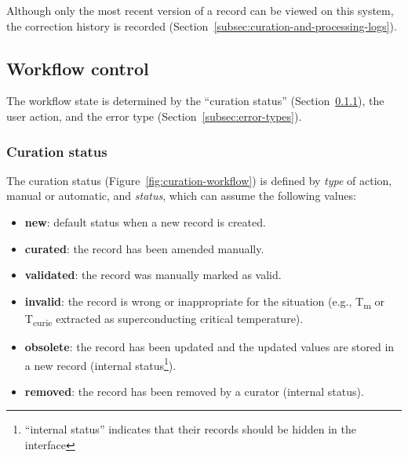 \documentclass[]{interact}
\theoremstyle{plain} %
\theoremstyle{definition}
\theoremstyle{remark}
\begin{document}
Although only the most recent version of a record can be viewed on this system, the correction history is recorded (Section~\ref{subsec:curation-and-processing-logs}). 



\subsection{Workflow control}
\label{subsec:workflow-control}
The workflow state is determined by the ``curation status'' (Section~\ref{subsec:curation-status}), the user action, and the error type (Section~\ref{subsec:error-types}).

\subsubsection{Curation status} 
\label{subsec:curation-status}
The curation status (Figure~\ref{fig:curation-workflow}) is defined by \emph{type} of action, manual or automatic, and \emph{status}, which can assume the following values: 
\begin{itemize}
    \item \textbf{new}: default status when a new record is created.
    \item \textbf{curated}: the record has been amended manually.
    \item \textbf{validated}: the record was manually marked as valid.
    \item \textbf{invalid}: the record is wrong or inappropriate for the situation (e.g., T\textsubscript{m} or T\textsubscript{curie} extracted as superconducting critical temperature).
    \item \textbf{obsolete}: the record has been updated and the updated values are stored in a new record (internal status\footnote{``internal status'' indicates that their records should be hidden in the interface}).
    \item \textbf{removed}: the record has been removed by a curator (internal status).
\end{itemize} 
    
\end{document}
